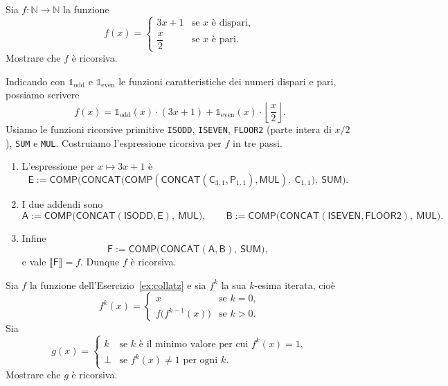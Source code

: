 \begin{ex}\label{ex:collatz}
Sia $f\colon\mathbb N\to\mathbb N$ la funzione
\[
f(x)=
\begin{cases}
3x+1 & \text{se $x$ è dispari},\\[2pt]
\dfrac{x}{2} & \text{se $x$ è pari}.
\end{cases}
\]
Mostrare che $f$ è ricorsiva.
\end{ex}

\begin{sol}
Indicando con $\mathbb 1_{\mathrm{odd}}$ e $\mathbb 1_{\mathrm{even}}$ le funzioni caratteristiche dei numeri dispari e pari, possiamo scrivere
\[
f(x)=\mathbb 1_{\mathrm{odd}}(x)\cdot(3x+1)+\mathbb 1_{\mathrm{even}}(x)\cdot\left\lfloor\frac{x}{2}\right\rfloor .
\]
Usiamo le funzioni ricorsive primitive \texttt{ISODD}, \texttt{ISEVEN}, \texttt{FLOOR2} (parte intera di $x/2$), \texttt{SUM} e \texttt{MUL}. Costruiamo l'espressione ricorsiva per $f$ in tre passi.
\begin{enumerate}
\item L'espressione per $x\mapsto 3x+1$ è
\[
\mathsf{E}:=\mathsf{COMP}\big(\mathsf{CONCAT}\big(\mathsf{COMP}(\mathsf{CONCAT}(\mathsf C_{3,1},\mathsf P_{1,1}),\mathsf{MUL}),\ \mathsf C_{1,1}\big),\ \mathsf{SUM}\big).
\]
\item I due addendi sono
\[
\mathsf{A}:=\mathsf{COMP}\big(\mathsf{CONCAT}(\mathsf{ISODD},\mathsf{E}),\ \mathsf{MUL}\big),
\qquad
\mathsf{B}:=\mathsf{COMP}\big(\mathsf{CONCAT}(\mathsf{ISEVEN},\mathsf{FLOOR2}),\ \mathsf{MUL}\big).
\]
\item Infine
\[
\mathsf{F}:=\mathsf{COMP}\big(\mathsf{CONCAT}(\mathsf{A},\mathsf{B}),\ \mathsf{SUM}\big),
\]
e vale $\llbracket\mathsf{F}\rrbracket=f$. Dunque $f$ è ricorsiva.
\end{enumerate}
\end{sol}

\newpage

\begin{ex}
Sia $f$ la funzione dell'Esercizio~\ref{ex:collatz} e sia $f^k$ la sua $k$-esima iterata, cioè
\[
f^k(x)=
\begin{cases}
x & \text{se } k=0,\\
f\big(f^{k-1}(x)\big) & \text{se } k>0.
\end{cases}
\]
Sia
\[
g(x)=
\begin{cases}
k & \text{se $k$ è il minimo valore per cui } f^k(x)=1,\\
\bot & \text{se } f^k(x)\neq1 \text{ per ogni } k.
\end{cases}
\]
Mostrare che $g$ è ricorsiva.
\end{ex}

